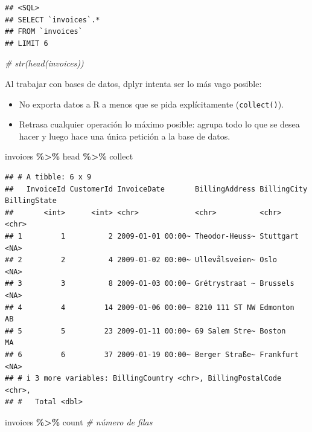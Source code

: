 \documentclass[
]{book}
\newenvironment{Shaded}{\begin{snugshade}}{\end{snugshade}}
\newcommand{\CommentTok}[1]{\textcolor[rgb]{0.56,0.35,0.01}{\textit{#1}}}
\newcommand{\NormalTok}[1]{#1}
\newcommand{\SpecialCharTok}[1]{\textcolor[rgb]{0.81,0.36,0.00}{\textbf{#1}}}
\begin{document}
\begin{verbatim}
## <SQL>
## SELECT `invoices`.*
## FROM `invoices`
## LIMIT 6
\end{verbatim}

\begin{Shaded}
\begin{Highlighting}[]
\CommentTok{\# str(head(invoices))}
\end{Highlighting}
\end{Shaded}

Al trabajar con bases de datos, dplyr intenta ser lo más vago posible:

\begin{itemize}
\item
  No exporta datos a R a menos que se pida explícitamente (\texttt{collect()}).
\item
  Retrasa cualquier operación lo máximo posible:
  agrupa todo lo que se desea hacer y luego hace una única petición a la base de datos.
\end{itemize}

\begin{Shaded}
\begin{Highlighting}[]
\NormalTok{invoices }\SpecialCharTok{\%\textgreater{}\%}\NormalTok{ head }\SpecialCharTok{\%\textgreater{}\%}\NormalTok{ collect}
\end{Highlighting}
\end{Shaded}

\begin{verbatim}
## # A tibble: 6 x 9
##   InvoiceId CustomerId InvoiceDate       BillingAddress BillingCity BillingState
##       <int>      <int> <chr>             <chr>          <chr>       <chr>       
## 1         1          2 2009-01-01 00:00~ Theodor-Heuss~ Stuttgart   <NA>        
## 2         2          4 2009-01-02 00:00~ Ullevålsveien~ Oslo        <NA>        
## 3         3          8 2009-01-03 00:00~ Grétrystraat ~ Brussels    <NA>        
## 4         4         14 2009-01-06 00:00~ 8210 111 ST NW Edmonton    AB          
## 5         5         23 2009-01-11 00:00~ 69 Salem Stre~ Boston      MA          
## 6         6         37 2009-01-19 00:00~ Berger Straße~ Frankfurt   <NA>        
## # i 3 more variables: BillingCountry <chr>, BillingPostalCode <chr>,
## #   Total <dbl>
\end{verbatim}

\begin{Shaded}
\begin{Highlighting}[]
\NormalTok{invoices }\SpecialCharTok{\%\textgreater{}\%}\NormalTok{ count }\CommentTok{\# número de filas}
\end{Highlighting}
\end{Shaded}
\end{document}
